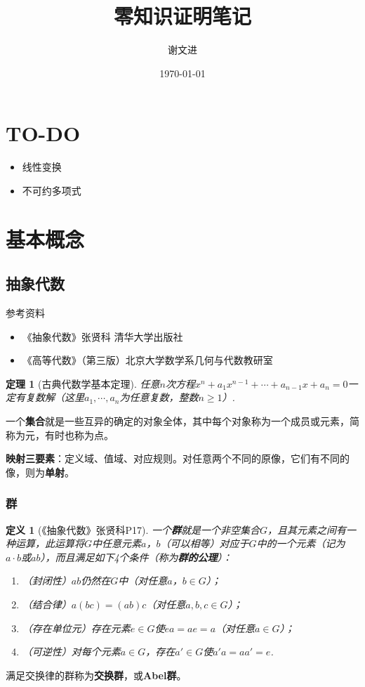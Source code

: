 \documentclass[10pt]{ctexart}
\title{零知识证明笔记}
\author{谢文进}
\date{\today}
\newtheorem{definition}{定义}
\newtheorem{theorem}{定理}
\begin{document}
\maketitle
\tableofcontents

\section{TO-DO}
\begin{itemize}
	\item 线性变换
	\item 不可约多项式
\end{itemize}

\section{基本概念}
\subsection{抽象代数}
参考资料
\begin{itemize}
	\item 《抽象代数》张贤科 { } 清华大学出版社
	\item 《高等代数》（第三版）北京大学数学系几何与代数教研室
\end{itemize}

\begin{theorem}[古典代数学基本定理]
	任意$n$次方程$x^n+a_1x^{n-1}+ \cdots + a_{n-1}x + a_n = 0$一定有复数解（这里$a_1, \cdots, a_n$为任意复数，整数$n \ge 1$）.
\end{theorem}

一个\textbf{集合}就是一些互异的确定的对象全体，其中每个对象称为一个成员或元素，简称为元，有时也称为点。

\textbf{映射三要素}：定义域、值域、对应规则。对任意两个不同的原像，它们有不同的像，则为\textbf{单射}。


\subsubsection{群}
\begin{definition}[《抽象代数》张贤科P17]
	一个\textbf{群}就是一个非空集合$G$，且其元素之间有一种运算，此运算将$G$中任意元素$a$，$b$（可以相等）对应于$G$中的一个元素（记为$a \cdot b$或$ab$），而且满足如下4个条件（称为\textbf{群的公理}）：
	\begin{enumerate}
		\item[（G1）]（封闭性）$ab$仍然在$G$中（对任意$a$，$b \in G$）；
		\item[（G2）]（结合律）$a(bc)=(ab)c$（对任意$a,b,c \in G$）；
		\item[（G3）]（存在单位元）存在元素$e \in G$使$ea = ae = a$（对任意$a \in G$）；
		\item[（G4）]（可逆性）对每个元素$a \in G$，存在$a' \in G$使$a'a = a a' = e$.
	\end{enumerate}
\end{definition}
满足交换律的群称为\textbf{交换群}，或\textbf{Abel群}。
\end{document}
